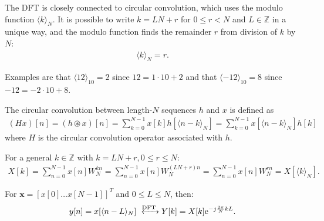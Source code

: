 The DFT is closely connected to circular convolution, which uses the modulo function $\langle k\rangle_N$. It is possible to write $k = LN+r$ for $0 \leq r < N$ and $L \in \mathbb{Z}$ in a unique way, and the modulo function finds the remainder $r$ from division of $k$ by $N$:
\begin{align*}
\langle k \rangle_N = r.
\end{align*}

Examples are that $\langle 12 \rangle_{10} = 2$ since $12 = 1 \cdot 10 + 2$ and that $\langle -12 \rangle_{10} = 8$ since $-12 = -2 \cdot 10 + 8$.

\begin{definition}
 	The circular convolution between length-$N$ sequences $h$ 		and $x$ is defined as
	\begin{align*}
	(Hx)[n] = (h \circledast x)[n] = \sum_{k = 0}^{N-1} x[k] 		h[\langle n-k\rangle_N] =\sum_{k = 0}^{N-1} x[\langle n-k		\rangle_N] h[k]
	\end{align*}
	where $H$ is the circular convolution operator associated 		with $h$.
\end{definition}

For a general $k\in\mathbb{Z}$ with $k = LN + r, 0 \leq r \leq N$:
\begin{align*}
X[k] = \sum_{n=0}^{N-1} x[n] W_N^{kn} = \sum_{n=0}^{N-1} x[n] W_N^{(LN+r)n} = \sum_{n=0}^{N-1} x[n] W_N^{rn} = X[\langle k\rangle_N].
\end{align*}

\begin{lemma}
For $\textbf{x} = [x[0] \dots x[N-1]]^T$ and $0 \leq L \leq N$, then:
\begin{align*}
y[n]  = x[\langle n-L\rangle_N] \xleftrightarrow{\text{DFT}} Y[k] = X[k] \text{e}^{-j\frac{2\pi}{N} kL}.
\end{align*}
\end{lemma}

